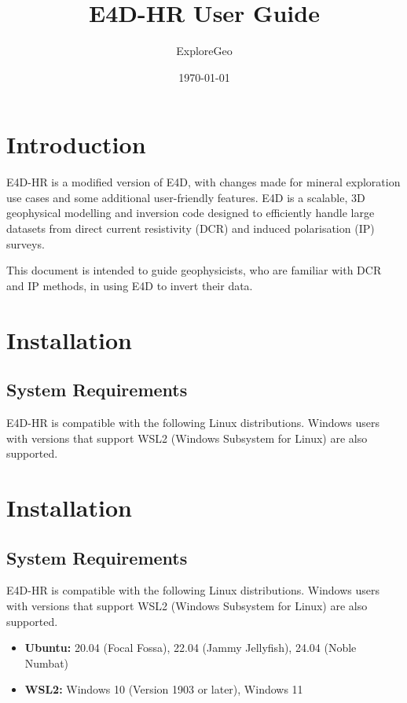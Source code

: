 \documentclass[a4paper,12pt]{article}
\title{E4D-HR User Guide}
\author{ExploreGeo}
\date{\today}
\begin{document}
\maketitle

\newpage

\tableofcontents

\newpage

\section{Introduction}

E4D-HR is a modified version of E4D, with changes made for mineral exploration use cases and some additional user-friendly features. E4D is a scalable, 3D geophysical modelling and inversion code designed to efficiently handle large datasets from direct current resistivity (DCR) and induced polarisation (IP) surveys.

This document is intended to guide geophysicists, who are familiar with DCR and IP methods, in using E4D to invert their data.

\section{Installation}

\subsection{System Requirements}

E4D-HR is compatible with the following Linux distributions. Windows users with versions that support WSL2 (Windows Subsystem for Linux) are also supported.

\section{Installation}

\subsection{System Requirements}

E4D-HR is compatible with the following Linux distributions. Windows users with versions that support WSL2 (Windows Subsystem for Linux) are also supported.

\begin{itemize}
    \item \textbf{Ubuntu:} 20.04 (Focal Fossa), 22.04 (Jammy Jellyfish), 24.04 (Noble Numbat)
    \item \textbf{WSL2:} Windows 10 (Version 1903 or later), Windows 11
\end{itemize}
\end{document}
